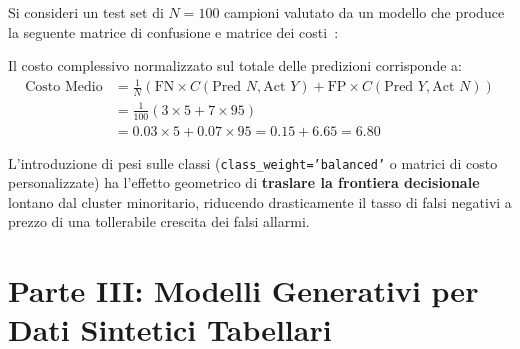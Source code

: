 \begin{example}
Si consideri un test set di $N = 100$ campioni valutato da un modello che produce la seguente matrice di confusione e matrice dei costi~\cite{mannocci2026imbalanced}:
\begin{table}[H]
\centering
\caption{Confronto tra Matrice di Confusione e Matrice dei Costi su $N = 100$ record.}
\label{tab:dm-cost-matrix-example}
\vspace{2mm}
\end{table}

\noindent
Il costo complessivo normalizzato sul totale delle predizioni corrisponde a:
\begin{align*}
    \text{Costo Medio} &= \frac{1}{N} \left( \text{FN} \times C(\text{Pred } N, \text{Act } Y) + \text{FP} \times C(\text{Pred } Y, \text{Act } N) \right) \\
    &= \frac{1}{100} \left( 3 \times 5 + 7 \times 95 \right) \\
    &= 0.03 \times 5 + 0.07 \times 95 = 0.15 + 6.65 = 6.80
\end{align*}
\end{example}

L'introduzione di pesi sulle classi (\texttt{class\_weight='balanced'} o matrici di costo personalizzate) ha l'effetto geometrico di \textbf{traslare la frontiera decisionale} lontano dal cluster minoritario, riducendo drasticamente il tasso di falsi negativi a prezzo di una tollerabile crescita dei falsi allarmi.
\FloatBarrier
\section{Parte III: Modelli Generativi per Dati Sintetici Tabellari}
\label{sec:dm-generative-models}

